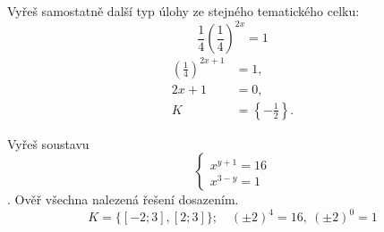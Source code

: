 \documentclass[11pt,a4paper]{article}
\begin{document}
\begin{zadaniReseniBox}[title={Samostatná práce 2}]
Vyřeš samostatně další typ úlohy ze stejného tematického celku:
\[
\displaystyle\frac{1}{4}\left(\frac{1}{4}\right)^{2x}=1
\]
\tcblower
\[\begin{aligned}\left(\frac{1}{4}\right)^{2x+1}&=1,\\2x+1&=0,\\K&=\left\{-\frac{1}{2}\right\}.\end{aligned}\]
\end{zadaniReseniBox}

\begin{zadaniReseniBox}[title={Rozšíření 1}]
Vyřeš soustavu \[
\begin{cases}x^{y+1}=16\\x^{3-y}=1\end{cases}
\]. Ověř všechna nalezená řešení dosazením.
\tcblower
\[
K=\{[-2;3],[2;3]\};\quad (\pm2)^4=16,\ (\pm2)^0=1
\]
\end{zadaniReseniBox}
\end{document}
